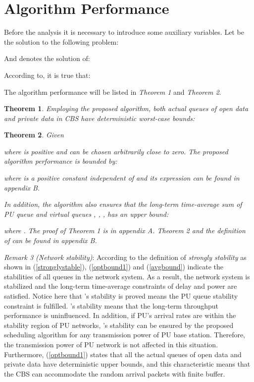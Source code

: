 \documentclass[journal]{IEEEtran}
\newtheorem{Theorem}{Theorem}
\begin{document}
\section{Algorithm Performance}
 Before the analysis it is necessary to introduce some auxiliary variables. Let
  be the solution to the following problem:



And  denotes the solution  of:


 According to\cite{stolyar2005maximizing}, it is true that:


The algorithm performance will be listed in \emph{Theorem 1} and \emph{Theorem 2}.

\begin{Theorem}
Employing the proposed algorithm, both actual queues of open data  and private data  in CBS have
deterministic worst-case bounds:


\end{Theorem}


\begin{Theorem}
Given

where  is positive and can be chosen arbitrarily close to zero. The proposed algorithm performance is bounded by:

where  is a positive constant independent of  and its expression can be found in appendix B.

In addition, the algorithm also ensures that the long-term time-average  sum of PU queue   and virtual queues , , ,
 has an upper bound:

where . The proof of Theorem 1 is in appendix A. Theorem 2 and the definition of  can be
found in appendix B.
\end{Theorem}



\emph{Remark 3 (Network stability)}: According to the definition of \emph{strongly stability} as shown in
(\ref{stronglystable}), (\ref{optbound1}) and (\ref{avgbound}) indicate the stabilities of all queues in the network
system. As a result, the network system is stabilized and the  long-term time-average constraints of delay and power are satisfied.
Notice here that 's stability is proved means the PU queue stability constraint is fulfilled.  's stability means that the long-term throughput performance is uninfluenced.  In addition, if PU's arrival rates are within the stability region of PU networks, 's stability can be ensured by the proposed scheduling algorithm for any transmission power of PU base station. Therefore, the transmission power of PU network is not affected in this situation. Furthermore, 
(\ref{optbound1}) states that all the actual queues of open data and private data have deterministic upper bounds, and
this characteristic means that the CBS can accommodate the random arrival packets with finite buffer.
\end{document}
